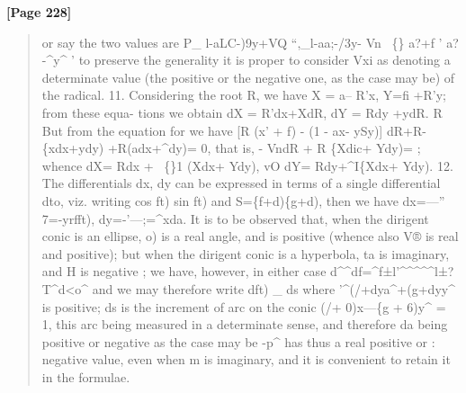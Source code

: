 \documentclass[11pt,a4paper]{book}
\begin{document}
\textbf{[Page 228]}\\[0.2cm]
\begin{quote}
or say the two values are
P\_ l-aLC-)9y+VQ ``,\_l-aa;-/3y- Vn
~\{\}
a?+f ' a?-\textasciicircum{}y\textasciicircum{} '
to preserve the generality it is proper to consider Vxi as denoting a determinate
value (the positive or the negative one, as the case may be) of the radical.
11. Considering the root R, we have X = a-- R'x, Y=fi +R'y; from these equa-
tions we obtain
dX = R'dx+XdR,
dY = Rdy +ydR.
R
But from the equation for we have
[R
(x'
+
f)
-
(1
- ax-
ySy)]
dR+R-\{xdx+ydy) +R(adx+\textasciicircum{}dy)=
0,
that is,
- VndR + R \{Xdic+ Ydy)=
;
whence
dX= Rdx + ~\{\}1 (Xdx+ Ydy),
vO
dY= Rdy+\textasciicircum{}I\{Xdx+
Ydy).
12. The differentials dx, dy can be expressed in terms of a single differential dto,
viz. writing
cos ft) sin ft)
and
S=\{f+d)\{g+d),
then we have
dx=---'' 7=-yrfft), dy=-'---;=\textasciicircum{}xda.
It is to be observed that, when the dirigent conic is an ellipse, o) is a real
angle, and is positive (whence also V® is real and positive); but when the dirigent
conic is a hyperbola, ta is imaginary, and H is negative ; we have, however, in either
case
d\textasciicircum{}\textasciicircum{}df=\textasciicircum{}f±l'\textasciicircum{}\textasciicircum{}\textasciicircum{}\textasciicircum{}\textasciicircum{}l±?T\textasciicircum{}d<o\textasciicircum{}
and we may therefore write
dft) \_ ds
where '\textasciicircum{}(/+dya\textasciicircum{}+(g+dyy\textasciicircum{} is positive; ds is the increment of arc on the conic
(/+ 0)x---\{g + 6)y\textasciicircum{} = 1, this arc being measured in a determinate sense, and therefore
da being positive or negative as the case may be -p\textasciicircum{} has thus a real positive or
:
negative value, even when m is imaginary, and it is convenient to retain it in the
formulae.
\end{quote}
\end{document}

